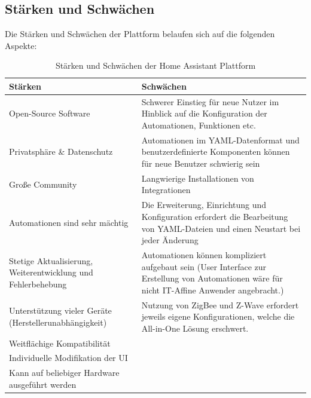 
\subsection{Stärken und Schwächen}
    Die Stärken und Schwächen der Plattform belaufen sich auf die folgenden Aspekte:
    \begin{table}[hbt!]
        \begin{center}
            \begin{tabular}{| p{7.875cm} | p{7.785cm} | }
                \hline
                    \textbf{Stärken} & \textbf{Schwächen} \\
                \hline
                    Open-Source Software & Schwerer Einstieg für neue Nutzer im Hinblick auf die Konfiguration der Automationen, Funktionen etc. \\ 
                \hline
                    Privatsphäre \& Datenschutz & Automationen im YAML-Datenformat und benutzerdefinierte Komponenten können für neue Benutzer schwierig sein \\ 
                \hline
                    Große Community & Langwierige Installationen von Integrationen \\ 
                \hline
                    Automationen sind sehr mächtig & Die Erweiterung, Einrichtung und Konfiguration erfordert die Bearbeitung von YAML-Dateien und einen Neustart bei jeder Änderung \\ 
                \hline
                    Stetige Aktualisierung, Weiterentwicklung und Fehlerbehebung & Automationen können kompliziert aufgebaut sein (User Interface zur Erstellung von Automationen wäre für nicht IT-Affine Anwender angebracht.) \\ 
                \hline 
                    Unterstützung vieler Geräte (Herstellerunabhängigkeit) & Nutzung von ZigBee und Z-Wave erfordert jeweils eigene Konfigurationen, welche die All-in-One Lösung erschwert. \\
                \hline
                    Weitflächige Kompatibilität &  \\
                \hline
                    Individuelle Modifikation der UI &  \\ 
                \hline
                    Kann auf beliebiger Hardware ausgeführt werden &  \\
                \hline
            \end{tabular}
        \end{center}
        \caption{Stärken und Schwächen der Home Assistant Plattform}
        \label{tab:prosConsHAOS}
    \end{table}
